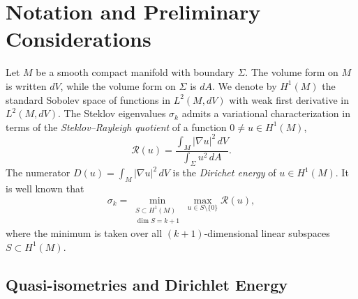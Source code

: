 \documentclass{CUP-JNL-FMP}%
\theoremstyle{definition}
\numberwithin{equation}{section}
\begin{document}
\section{Notation and Preliminary Considerations}\label{section:prelim}

Let $M$ be a smooth compact manifold with boundary $\Sigma$. The volume form on $M$ is written $dV$, while
the volume form on $\Sigma$ is $dA$. We denote by $H^1(M)$ the standard Sobolev space of functions in $ L^2(M,dV)$ with weak first derivative in $L^2(M,dV)$.
The Steklov eigenvalues $\sigma_k$ admits a variational characterization in terms of the \emph{Steklov--Rayleigh quotient} of a function $0\neq u \in H^1(M)$,
\begin{equation*}\label{StekRayleighQuotient}
    \mathcal{R}(u) = \frac{\int_{M} |\nabla u|^2\,dV}{\int_{\Sigma} u^2\,dA}.
\end{equation*}
The numerator $D(u)=\int_{M} |\nabla u|^2\,dV$ is the \emph{Dirichet energy} of $u\in H^1(M)$.
It is well known that
\begin{equation}\label{eq:minmaxsigmak}
    \sigma_k = \min_{\substack{S \subset H^1(M) \\ \dim S = k+1}}
    \max_{u \in S \setminus \{0\}} \mathcal{R}(u),
\end{equation}
where the minimum is taken over all $(k+1)$-dimensional linear subspaces $S\subset H^1(M)$.

\subsection{Quasi-isometries and Dirichlet Energy}
\end{document}
